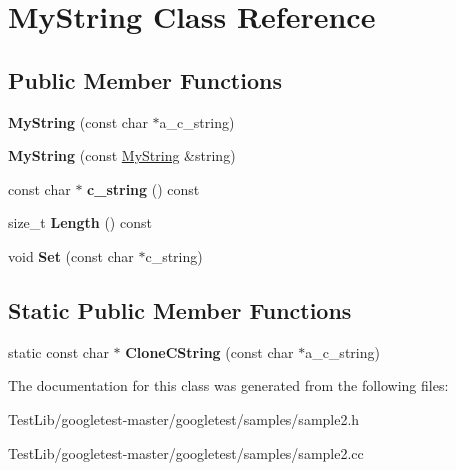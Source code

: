 \hypertarget{classMyString}{}\section{My\+String Class Reference}
\label{classMyString}
\subsection*{Public Member Functions}
\begin{DoxyCompactItemize}
\item 
\mbox{\label{classMyString_a28134eb91b6698f46b12accefa157d0f}} 
{\bfseries My\+String} (const char $\ast$a\+\_\+c\+\_\+string)
\item 
\mbox{\label{classMyString_ae24c7cf89a58dd2287303df2ac054c66}} 
{\bfseries My\+String} (const \hyperlink{classMyString}{My\+String} \&string)
\item 
\mbox{\label{classMyString_aff2af0cf30db39fe24a235670ee6ff25}} 
const char $\ast$ {\bfseries c\+\_\+string} () const
\item 
\mbox{\label{classMyString_a4eb168b1ec401a732b3859abe004d648}} 
size\+\_\+t {\bfseries Length} () const
\item 
\mbox{\label{classMyString_a521c4cd7eccac6ce554d8a51505e4970}} 
void {\bfseries Set} (const char $\ast$c\+\_\+string)
\end{DoxyCompactItemize}
\subsection*{Static Public Member Functions}
\begin{DoxyCompactItemize}
\item 
\mbox{\label{classMyString_a40753dcfa3314a8993f32bdd75d67ce2}} 
static const char $\ast$ {\bfseries Clone\+C\+String} (const char $\ast$a\+\_\+c\+\_\+string)
\end{DoxyCompactItemize}


The documentation for this class was generated from the following files\+:\begin{DoxyCompactItemize}
\item 
Test\+Lib/googletest-\/master/googletest/samples/sample2.\+h\item 
Test\+Lib/googletest-\/master/googletest/samples/sample2.\+cc\end{DoxyCompactItemize}
